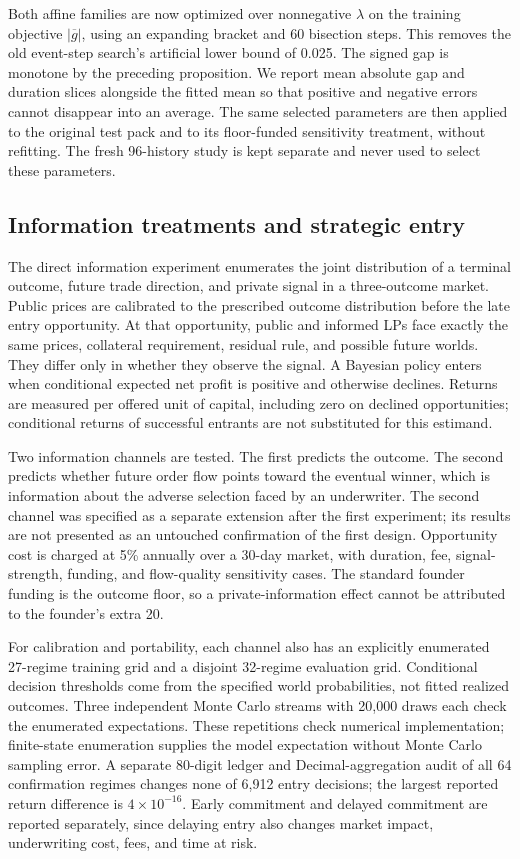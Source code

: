 \documentclass[10pt]{article}
\begin{document}
Both affine families are now optimized over nonnegative $\lambda$ on the training objective $|\overline g|$, using an expanding bracket and 60 bisection steps. This removes the old event-step search's artificial lower bound of 0.025. The signed gap is monotone by the preceding proposition. We report mean absolute gap and duration slices alongside the fitted mean so that positive and negative errors cannot disappear into an average. The same selected parameters are then applied to the original test pack and to its floor-funded sensitivity treatment, without refitting. The fresh 96-history study is kept separate and never used to select these parameters.

\subsection{Information treatments and strategic entry}

The direct information experiment enumerates the joint distribution of a terminal outcome, future trade direction, and private signal in a three-outcome market. Public prices are calibrated to the prescribed outcome distribution before the late entry opportunity. At that opportunity, public and informed LPs face exactly the same prices, collateral requirement, residual rule, and possible future worlds. They differ only in whether they observe the signal. A Bayesian policy enters when conditional expected net profit is positive and otherwise declines. Returns are measured per offered unit of capital, including zero on declined opportunities; conditional returns of successful entrants are not substituted for this estimand.

Two information channels are tested. The first predicts the outcome. The second predicts whether future order flow points toward the eventual winner, which is information about the adverse selection faced by an underwriter. The second channel was specified as a separate extension after the first experiment; its results are not presented as an untouched confirmation of the first design. Opportunity cost is charged at 5\% annually over a 30-day market, with duration, fee, signal-strength, funding, and flow-quality sensitivity cases. The standard founder funding is the outcome floor, so a private-information effect cannot be attributed to the founder's extra 20.

For calibration and portability, each channel also has an explicitly enumerated 27-regime training grid and a disjoint 32-regime evaluation grid. Conditional decision thresholds come from the specified world probabilities, not fitted realized outcomes. Three independent Monte Carlo streams with 20,000 draws each check the enumerated expectations. These repetitions check numerical implementation; finite-state enumeration supplies the model expectation without Monte Carlo sampling error. A separate 80-digit ledger and Decimal-aggregation audit of all 64 confirmation regimes changes none of 6,912 entry decisions; the largest reported return difference is $4\times10^{-16}$. Early commitment and delayed commitment are reported separately, since delaying entry also changes market impact, underwriting cost, fees, and time at risk.
\end{document}
